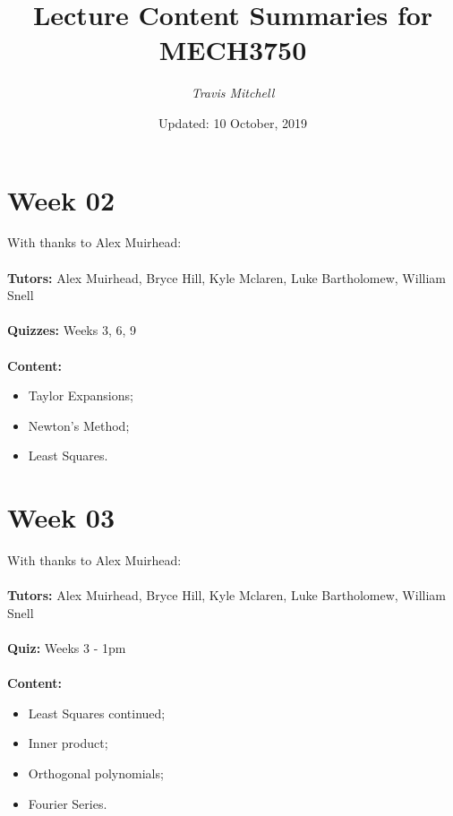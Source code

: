 \documentclass[11pt,a4paper]{report}
\author{\textit{Travis Mitchell}}
\title{Lecture Content Summaries for MECH3750}
\date{Updated: 10 October, 2019}
\begin{document}
	\maketitle
	\clearpage
	
	\begingroup
	\makeatletter
	\let\clearpage\relax
	\vspace*{\fill}
	\vspace*{\dimexpr-50\p@-\baselineskip}
	\chapter*{Week 02}
	With thanks to Alex Muirhead: \\\\
	\textbf{Tutors:} Alex Muirhead, Bryce Hill, Kyle Mclaren, Luke Bartholomew, William Snell \\\\
	\textbf{Quizzes:} Weeks 3, 6, 9 \\\\	
	\textbf{Content:}
	\begin{itemize}
		\item Taylor Expansions;
		\item Newton's Method;
		\item Least Squares.
	\end{itemize}
	\vspace*{\fill}
	\endgroup
	
	
	
	\begingroup
	\makeatletter
	\let\clearpage\relax
	\vspace*{\fill}%
	\vspace*{\dimexpr-50\p@-\baselineskip}
	\chapter*{Week 03}
	With thanks to Alex Muirhead: \\\\
	\textbf{Tutors:} Alex Muirhead, Bryce Hill, Kyle Mclaren, Luke Bartholomew, William Snell \\\\
	\textbf{Quiz:} Weeks 3 - 1pm \\\\	
	\textbf{Content:}
	\begin{itemize}
		\item Least Squares continued;
		\item Inner product;
		\item Orthogonal polynomials;
		\item Fourier Series.
	\end{itemize}
	\vspace*{\fill}
	\endgroup
	
	
\end{document}
